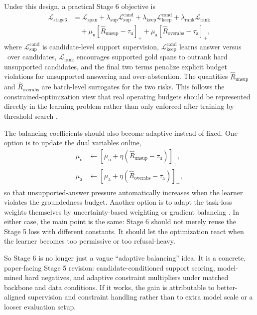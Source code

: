 Under this design, a practical Stage 6 objective is
\begin{align}
  \mathcal{L}_{\mathrm{stage6}}
  &=
  \mathcal{L}_{\mathrm{span}}
  +
  \lambda_{\mathrm{sup}} \mathcal{L}_{\mathrm{sup}}^{\mathrm{cand}}
  +
  \lambda_{\mathrm{keep}} \mathcal{L}_{\mathrm{keep}}^{\mathrm{cand}}
  +
  \lambda_{\mathrm{rank}} \mathcal{L}_{\mathrm{rank}} \\
  &\quad
  +
  \mu_{\mathrm{u}} \left[\hat{R}_{\mathrm{unsup}} - \tau_{\mathrm{u}}\right]_{+}
  +
  \mu_{\mathrm{a}} \left[\hat{R}_{\mathrm{overabs}} - \tau_{\mathrm{a}}\right]_{+},
\end{align}
where
\(\mathcal{L}_{\mathrm{sup}}^{\mathrm{cand}}\)
is candidate-level support supervision,
\(\mathcal{L}_{\mathrm{keep}}^{\mathrm{cand}}\)
learns answer versus \abstain\ over candidates,
\(\mathcal{L}_{\mathrm{rank}}\)
encourages supported gold spans to outrank hard unsupported candidates, and the
final two terms penalize explicit budget violations for unsupported answering
and over-abstention.
The quantities
\(\hat{R}_{\mathrm{unsup}}\)
and
\(\hat{R}_{\mathrm{overabs}}\)
are batch-level surrogates for the two risks.
This follows the constrained-optimization view that real operating budgets
should be represented directly in the learning problem rather than only
enforced after training by threshold search \citep{cotter2019optimization}.

The balancing coefficients should also become adaptive instead of fixed.
One option is to update the dual variables online,
\begin{align}
  \mu_{\mathrm{u}}
  &\leftarrow
  \left[\mu_{\mathrm{u}} + \eta\left(\hat{R}_{\mathrm{unsup}} - \tau_{\mathrm{u}}\right)\right]_{+}, \\
  \mu_{\mathrm{a}}
  &\leftarrow
  \left[\mu_{\mathrm{a}} + \eta\left(\hat{R}_{\mathrm{overabs}} - \tau_{\mathrm{a}}\right)\right]_{+},
\end{align}
so that unsupported-answer pressure automatically increases when the learner
violates the groundedness budget.
Another option is to adapt the task-loss weights themselves by uncertainty-based
weighting or gradient balancing
\citep{kendall2018multi,chen2018gradnorm}.
In either case, the main point is the same:
Stage 6 should not merely reuse the Stage 5 loss with different constants.
It should let the optimization react when the learner becomes too permissive or
too refusal-heavy.

So Stage 6 is no longer just a vague ``adaptive balancing'' idea.
It is a concrete, paper-facing Stage 5 revision:
candidate-conditioned support scoring, model-mined hard negatives, and
adaptive constraint multipliers under matched backbone and data conditions.
If it works, the gain is attributable to better-aligned supervision and
constraint handling rather than to extra model scale or a looser evaluation
setup.

